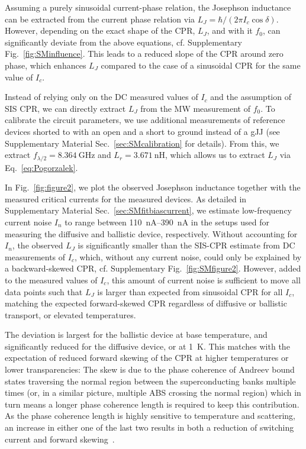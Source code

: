 Assuming a purely sinusoidal current-phase relation, the Josephson inductance can be extracted from the current phase relation via $L_J = \hbar/(2\pi I_c \cos\delta)$.
%
However, depending on the exact shape of the CPR, $L_J$, and with it $f_0$, can significantly deviate from the above equations, cf. Supplementary Fig.~\ref{fig:SMinfluence}.
%
This leads to a reduced slope of the CPR around zero phase, which enhances $L_J$ compared to the case of a sinusoidal CPR for the same value of $I_c$.

Instead of relying only on the DC measured values of $I_c$ and the assumption of SIS CPR, we can directly extract $L_J$ from the MW measurement of $f_0$.
%
To calibrate the circuit parameters, we use additional measurements of reference devices shorted to with an open and a short to ground instead of a gJJ (see Supplementary Material Sec.~\ref{sec:SMcalibration} for details).
%
From this, we extract $f_{\lambda/2}=\SI{8.364}{\giga\hertz}$ and $L_r=\SI{3.671}{\nano\henry}$, which allows us to extract $L_J$ via Eq.~\ref{eq:Pogorzalek}.

In Fig.~\ref{fig:figure2}, we plot the observed Josephson inductance together with the measured critical currents for the measured devices.
%
As detailed in Supplementary Material Sec.~\ref{sec:SMfitbiascurrent}, we estimate low-frequency current noise $I_n$ to range between \SIrange{110}{390}{\nano\ampere} in the setups used for measuring the diffusive and ballistic device, respectively.
%
Without accounting for $I_n$, the observed $L_J$ is significantly smaller than the SIS-CPR estimate from DC measurements of $I_c$, which, without any current noise, could only be explained by a backward-skewed CPR, cf. Supplementary Fig.~\ref{fig:SMfigure2}.
%
However, added to the measured values of $I_c$, this amount of current noise is sufficient to move all data points such that $L_J$ is larger than expected from sinusoidal CPR for all $I_c$, matching the expected forward-skewed CPR regardless of diffusive or ballistic transport, or elevated temperatures.


The deviation is largest for the ballistic device at base temperature, and significantly reduced for the diffusive device, or at \SI{1}{\kelvin}.
%
This matches with the expectation of reduced forward skewing of the CPR at higher temperatures or lower transparencies:
%
The skew is due to the phase coherence of Andreev bound states traversing the normal region between the superconducting banks multiple times (or, in a similar picture, multiple ABS crossing the normal region) which in turn means a longer phase coherence length is required to keep this contribution.
%
As the phase coherence length is highly sensitive to temperature and scattering, an increase in either one of the last two results in both a reduction of switching current and forward skewing~\cite{fuechsleEffectMicrowavesCurrentPhase2009,hagymasiJosephsonCurrentBallistic2010,black-schafferStronglyAnharmonicCurrentphase2010,rakytaMagneticFieldOscillations2016,englishObservationNonsinusoidalCurrentphase2016}.


